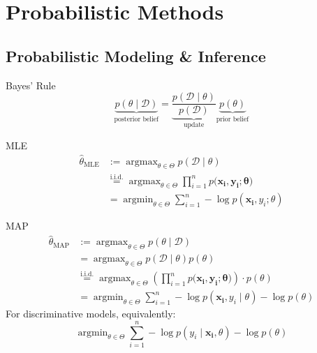 \documentclass[a4paper,11pt]{article}
\begin{document}
\section*{Probabilistic Methods}

\subsection*{Probabilistic Modeling \& Inference}

\begin{mainbox}{Bayes' Rule}
    \[
        \underbrace{p(\theta \; | \; \mathcal{D})}_\text{posterior belief} = \underbrace{\frac{p(\mathcal{D \; | \; \theta})}{p(\mathcal{D})}}_\text{update} \underbrace{p(\theta)}_\text{prior belief}
    \]
\end{mainbox}

\begin{mainbox}{MLE}
    \begin{align*}
        \hat{\theta}_\text{MLE} &:= \mathop{\arg \max}_{\theta \in \Theta} p(\mathcal{D} \; | \; \theta) \\
        &\overset{\text{i.i.d.}}{=} \mathop{\arg \max}_{\theta \in \Theta} \prod_{i = 1}^n p(\mathbf{x_i, y_i; \theta)} \\
        &= \mathop{\arg \min}_{\theta \in \Theta} \sum_{i = 1}^n -\log p(\mathbf{x_i}, y_i; \theta)
    \end{align*}
\end{mainbox}

\begin{mainbox}{MAP}
    \begin{align*}
        \hat{\theta}_\text{MAP} &:= \mathop{\arg \max}_{\theta \in \Theta} p(\theta \; | \; \mathcal{D}) \\
        &= \mathop{\arg \max}_{\theta \in \Theta} p(\mathcal{D} \; | \; \theta) p(\theta) \\
        &\overset{\text{i.i.d.}}{=} \mathop{\arg \max}_{\theta \in \Theta} \left( \prod_{i = 1}^n p(\mathbf{x_i, y_i; \theta)} \right) \cdot p(\theta) \\
        &= \mathop{\arg \min}_{\theta \in \Theta} \sum_{i = 1}^n -\log p(\mathbf{x_i}, y_i \; | \; \theta) - \log p(\theta)
    \end{align*}
    For discriminative models, equivalently:
    \[
        \mathop{\arg \min}_{\theta \in \Theta} \sum_{i = 1}^n -\log p(y_i \; | \; \mathbf{x_i}, \theta) - \log p(\theta)
    \]
\end{mainbox}



\end{document}
